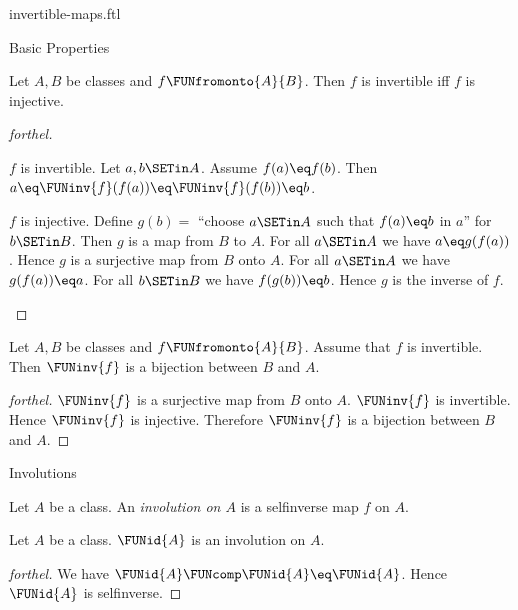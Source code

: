 \documentclass{naproche-library}
\begin{document}
\begin{smodule}[title=Invertible Maps]{invertible-maps.ftl}
\begin{sfragment}{Basic Properties}
  \begin{proposition}[forthel,id=FOUNDATIONS_09_6777575974109184]
    Let $A, B$ be classes and $f \FUNfromonto{A}{B}$.
    Then $f$ is invertible iff $f$ is injective.
  \end{proposition}
  \begin{proof}[forthel]
    \begin{case}{$f$ is invertible.}
      Let $a, b \SETin A$.
      Assume $f(a) \eq f(b)$.
      Then $a \eq \FUNinv{f}(f(a)) \eq \FUNinv{f}(f(b)) \eq b$.
    \end{case}

    \begin{case}{$f$ is injective.}
      Define $g(b) =$ ``choose $a \SETin A$ such that $f(a) \eq b$ in $a$'' for
      $b \SETin B$.
      Then $g$ is a map from $B$ to $A$.
      For all $a \SETin A$ we have $a \eq g(f(a))$.
      Hence $g$ is a surjective map from $B$ onto $A$.
      For all $a \SETin A$ we have $g(f(a)) \eq a$.
      For all $b \SETin B$ we have $f(g(b)) \eq b$.
      Hence $g$ is the inverse of $f$.
    \end{case}
  \end{proof}

  \begin{corollary}[forthel,id=FOUNDATIONS_09_5708971514003456]
    Let $A, B$ be classes and $f \FUNfromonto{A}{B}$.
    Assume that $f$ is invertible.
    Then $\FUNinv{f}$ is a bijection between $B$ and $A$.
  \end{corollary}
  \begin{proof}[forthel]
    $\FUNinv{f}$ is a surjective map from $B$ onto $A$.
    $\FUNinv{f}$ is invertible.
    Hence $\FUNinv{f}$ is injective.
    Therefore $\FUNinv{f}$ is a bijection between $B$ and $A$.
  \end{proof}
\end{sfragment}

\begin{sfragment}{Involutions}

  \begin{definition}[forthel,id=FOUNDATIONS_09_7282039688527872]
    Let $A$ be a class.
    An \emph{involution on $A$} is a selfinverse map $f$ on $A$.
  \end{definition}

  \begin{proposition}[forthel,id=FOUNDATIONS_09_7944474185433088]
    Let $A$ be a class.
    $\FUNid{A}$ is an involution on $A$.
  \end{proposition}
  \begin{proof}[forthel]
    We have $\FUNid{A} \FUNcomp \FUNid{A} \eq \FUNid{A}$.
    Hence $\FUNid{A}$ is selfinverse.
  \end{proof}


\end{sfragment}
\end{smodule}
\end{document}

